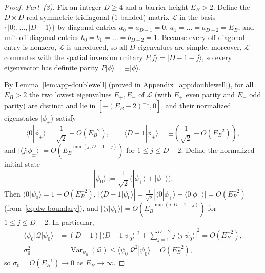 \documentclass[11pt,a4paper]{article}
\numberwithin{equation}{section}
\theoremstyle{plain}
\theoremstyle{definition}
\newcommand{\Var}{\operatorname{Var}}
\begin{document}
\begin{proof}
\emph{Part~(3).} Fix an integer $D\ge 4$ and a barrier height $E_B > 2$. Define the $D\times D$ real symmetric tridiagonal ($1$-banded) matrix $\mathcal{L}$ in the basis $\{|0\rangle,\dots,|D-1\rangle\}$ by diagonal entries $a_0 = a_{D-1} = 0$, $a_1 = \dots = a_{D-2} = E_B$, and unit off-diagonal entries $b_0 = b_1 = \dots = b_{D-2} = 1$. Because every off-diagonal entry is nonzero, $\mathcal{L}$ is unreduced, so all $D$ eigenvalues are simple; moreover, $\mathcal{L}$ commutes with the spatial inversion unitary $P|j\rangle = |D-1-j\rangle$, so every eigenvector has definite parity $P|\phi\rangle = \pm|\phi\rangle$.

By Lemma~\ref{lem:app-doublewell} (proved in Appendix~\ref{app:doublewell}), for all $E_B > 2$ the two lowest eigenvalues $E_+, E_-$ of $\mathcal{L}$ (with $E_+$ even parity and $E_-$ odd parity) are distinct and lie in $[-(E_B-2)^{-1}, 0]$, and their normalized eigenstates $|\phi_\pm\rangle$ satisfy
\[
  \langle 0|\phi_\pm\rangle = \frac{1}{\sqrt{2}} - O(E_B^{-2}), \qquad
  \langle D-1|\phi_\pm\rangle = \pm\left(\frac{1}{\sqrt{2}} - O(E_B^{-2})\right),
\]
and $|\langle j|\phi_\pm\rangle| = O(E_B^{-\min(j,D-1-j)})$ for $1\le j\le D-2$. Define the normalized initial state
\[
  |\psi_0\rangle := \frac{1}{\sqrt{2}}\bigl(|\phi_+\rangle + |\phi_-\rangle\bigr).
\]
Then $\langle 0|\psi_0\rangle = 1 - O(E_B^{-2})$, $|\langle D-1|\psi_0\rangle| = \frac{1}{\sqrt{2}}|\langle 0|\phi_+\rangle - \langle 0|\phi_-\rangle| = O(E_B^{-2})$ (from~\eqref{eq:dw-boundary}), and $|\langle j|\psi_0\rangle| = O(E_B^{-\min(j,D-1-j)})$ for $1\le j\le D-2$. In particular,
\begin{align*}
  \langle\psi_0|\mathcal{Q}|\psi_0\rangle &= (D-1)|\langle D-1|\psi_0\rangle|^2 + \sum_{j=1}^{D-2} j|\langle j|\psi_0\rangle|^2 = O(E_B^{-2}), \\
  \sigma_0^2 &= \Var_{\psi_0}(\mathcal{Q}) \le \langle\psi_0|\mathcal{Q}^2|\psi_0\rangle = O(E_B^{-2}),
\end{align*}
so $\sigma_0 = O(E_B^{-1}) \to 0$ as $E_B\to\infty$.


\end{proof}
\end{document}
